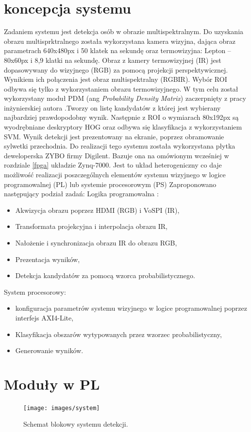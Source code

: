 \section{koncepcja systemu}
Zadaniem systemu jest detekcja osób w obrazie multispektralnym. Do uzyskania obrazu multisprktralnego została wykorzystana kamera wizyjna, dająca obraz parametrach 640x480px i 50 klatek na sekundę oraz termowizyjna: Lepton – 80x60px i 8,9 klatki na sekundę. Obraz z kamery termowizyjnej (IR) jest dopasowywany do wizyjnego (RGB) za pomocą projekcji perspektywicznej. Wynikiem ich połączenia jest obraz multispektralny (RGBIR). Wybór ROI odbywa się tylko z wykorzystaniem obrazu termowizyjnego. W tym celu został wykorzystany moduł PDM (ang \textit{Probability Density Matrix}) zaczerpnięty z pracy inżynierskiej autora \cite{kankaing}.Tworzy on listę kandydatów z której jest wybierany najbardziej prawdopodobny wynik. Następnie z ROI o wymiarach 80x192px są wyodrębniane deskryptory HOG oraz odbywa się klasyfikacja z wykorzystaniem SVM. Wynik detekcji jest prezentowany na ekranie, poprzez obramowanie sylwetki przechodnia.
Do realizacji tego systemu została wykorzystana płytka deweloperska ZYBO firmy Digilent. Bazuje ona na omówionym wcześniej w rozdziale \ref{fpga} układzie Zynq-7000. Jest to układ heterogeniczny co daje możliwość realizacji poszczególnych elementów systemu wizyjnego w logice programowalnej (PL) lub systemie procesorowym (PS) 
Zaproponowano następujący podział zadań:
Logika programowalna :
\begin{itemize}
\item Akwizycja obrazu poprzez HDMI (RGB) i VoSPI (IR),
\item Transformata projekcyjna i interpolacja obrazu IR,
\item Nałożenie i synchronizacja obrazu IR do obrazu RGB,
\item Prezentacja wyników,
\item Detekcja kandydatów za pomocą wzorca probabilistycznego.
\end{itemize}
System procesorowy:
\begin{itemize}
\item konfiguracja parametrów systemu wizyjnego w logice programowalnej poprzez interfejs AXI4-Lite,
\item Klasyfikacja obszarów wytypowanych przez wzorzec probabilistyczny,
\item Generowanie wyników.
\end{itemize}
\section{Moduły w PL}
\begin{figure}[h]
    \centering
    \texttt{[image: images/system]}
    \caption{Schemat blokowy systemu detekcji.}
    \label{fig:systemwizyjny}
\end{figure}


